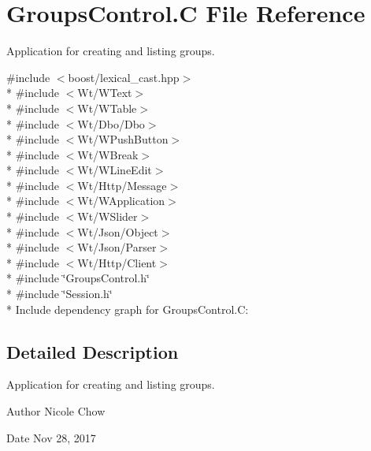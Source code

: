 \hypertarget{GroupsControl_8C}{}\section{Groups\+Control.\+C File Reference}
\label{GroupsControl_8C}


Application for creating and listing groups.  


{\ttfamily \#include $<$boost/lexical\+\_\+cast.\+hpp$>$}\\*
{\ttfamily \#include $<$Wt/\+W\+Text$>$}\\*
{\ttfamily \#include $<$Wt/\+W\+Table$>$}\\*
{\ttfamily \#include $<$Wt/\+Dbo/\+Dbo$>$}\\*
{\ttfamily \#include $<$Wt/\+W\+Push\+Button$>$}\\*
{\ttfamily \#include $<$Wt/\+W\+Break$>$}\\*
{\ttfamily \#include $<$Wt/\+W\+Line\+Edit$>$}\\*
{\ttfamily \#include $<$Wt/\+Http/\+Message$>$}\\*
{\ttfamily \#include $<$Wt/\+W\+Application$>$}\\*
{\ttfamily \#include $<$Wt/\+W\+Slider$>$}\\*
{\ttfamily \#include $<$Wt/\+Json/\+Object$>$}\\*
{\ttfamily \#include $<$Wt/\+Json/\+Parser$>$}\\*
{\ttfamily \#include $<$Wt/\+Http/\+Client$>$}\\*
{\ttfamily \#include \char`\"{}Groups\+Control.\+h\char`\"{}}\\*
{\ttfamily \#include \char`\"{}Session.\+h\char`\"{}}\\*
Include dependency graph for Groups\+Control.\+C\+:


\subsection{Detailed Description}
Application for creating and listing groups. 

\begin{DoxyAuthor}{Author}
Nicole Chow 
\end{DoxyAuthor}
\begin{DoxyDate}{Date}
Nov 28, 2017 
\end{DoxyDate}
